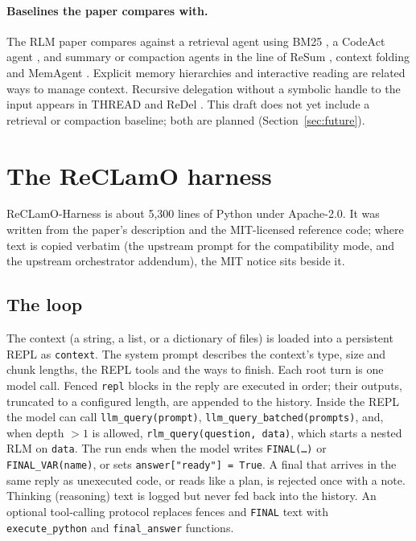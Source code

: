 \documentclass[11pt]{article}
\newcommand{\code}[1]{\texttt{#1}}
\begin{document}
\paragraph{Baselines the paper compares with.}
The RLM paper compares against a retrieval agent using BM25
\citep{robertson2009bm25}, a CodeAct agent \citep{wang2024codeact}, and summary
or compaction agents in the line of ReSum \citep{wu2025resum}, context folding
\citep{sun2025contextfolding} and MemAgent \citep{yu2025memagent}. Explicit memory
hierarchies \citep{packer2024memgpt} and interactive reading
\citep{chen2023memorymaze} are related ways to manage context. Recursive
delegation without a symbolic handle to the input appears in THREAD
\citep{schroeder2025thread} and ReDel \citep{zhu2024redel}. This draft does not yet
include a retrieval or compaction baseline; both are planned
(Section~\ref{sec:future}).

\section{The ReCLamO harness}
\label{sec:harness}

ReCLamO-Harness is about 5,300 lines of Python under Apache-2.0. It was written
from the paper's description and the MIT-licensed reference code; where text is
copied verbatim (the upstream prompt for the compatibility mode, and the upstream
orchestrator addendum), the MIT notice sits beside it.

\subsection{The loop}
The context (a string, a list, or a dictionary of files) is loaded into a
persistent REPL as \code{context}. The system prompt describes the context's
type, size and chunk lengths, the REPL tools and the ways to finish. Each root turn
is one model call. Fenced \code{repl} blocks in the reply are executed in order;
their outputs, truncated to a configured length, are appended to the history. Inside
the REPL the model can call \code{llm\_query(prompt)},
\code{llm\_query\_batched(prompts)}, and, when depth $>1$ is allowed,
\code{rlm\_query(question, data)}, which starts a nested RLM on \code{data}. The
run ends when the model writes \code{FINAL(\ldots)} or \code{FINAL\_VAR(name)},
or sets \code{answer["ready"] = True}. A final that arrives in the same reply as
unexecuted code, or reads like a plan, is rejected once with a note. Thinking
(reasoning) text is logged but never fed back into the history. An optional
tool-calling protocol replaces fences and \code{FINAL} text with
\code{execute\_python} and \code{final\_answer} functions.
\end{document}
